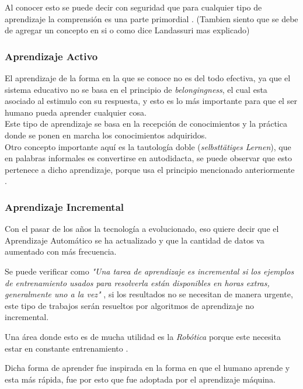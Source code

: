             Al conocer esto se puede decir con seguridad que para cualquier tipo de aprendizaje la comprensi\'on es 
            una parte primordial \cite{perez2014}.
            (Tambien siento que se debe de agregar un concepto en si o como dice Landassuri mas explicado)

        \subsubsection{Aprendizaje Activo}
            El aprendizaje de la forma en la que se conoce no es del todo efectiva, ya que el sistema educativo
            no se basa en el principio de \textit{belongingness}, el cual esta asociado al estimulo con su respuesta,
            y esto es lo m\'as importante para que el ser humano pueda aprender cualquier cosa.\\
            Este tipo de aprendizaje se basa en la recepci\'on de conocimientos y la pr\'actica donde se ponen en marcha los conocimientos adquiridos.\\
            Otro concepto importante aqu\'i es la tautolog\'ia doble (\textit{selbstt\"atiges Lernen}), que en palabras informales es convertirse en autodidacta, 
            se puede observar que esto pertenece a dicho aprendizaje, porque usa el principio mencionado anteriormente \cite{Huber2008}.
   

 \subsubsection{Aprendizaje Incremental}
        Con el pasar de los años la tecnología a evolucionado, eso quiere decir que el Aprendizaje Automático se ha actualizado y que la 
        cantidad de datos va aumentado con más frecuencia.
        
        Se puede verificar como \textit{"Una tarea de aprendizaje es incremental si los ejemplos de entrenamiento usados para 
        resolverla están disponibles en horas extras, generalmente uno a la vez"} \cite{GiraudCarrier2000}, si los resultados no se 
        necesitan de manera urgente, este tipo de trabajos serán resueltos por algoritmos de aprendizaje no incremental. 

        Una área donde esto es de mucha utilidad es la \textit{Rob\'otica} porque este necesita estar en constante entrenamiento \cite{GiraudCarrier2000}.

        Dicha forma de aprender fue inspirada en la forma en que el humano aprende y esta más rápida, fue por esto que fue adoptada 
        por el aprendizaje m\'aquina.

